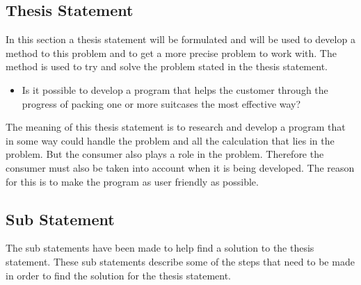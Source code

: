 \subsection{Thesis Statement}
In this section a thesis statement will be formulated and will be used to develop a method to this problem and to get a more precise problem to work with. The method is used to try and solve the problem stated in the thesis statement.

\begin{itemize}
\item Is it possible to develop a program that helps the customer through the progress of packing one or more suitcases the most effective way?
\end{itemize}

The meaning of this thesis statement is to research and develop a program that in some way could handle the problem and all the calculation that lies in the problem. But the consumer also plays a role in the problem.
Therefore the consumer must also be taken into account when it is being developed. The reason for this is to make the program as user friendly as possible.

\subsection*{Sub Statement}
The sub statements have been made to help find a solution to the thesis statement. These sub statements describe some of the steps that need to be made in order to find the solution for the thesis statement.

